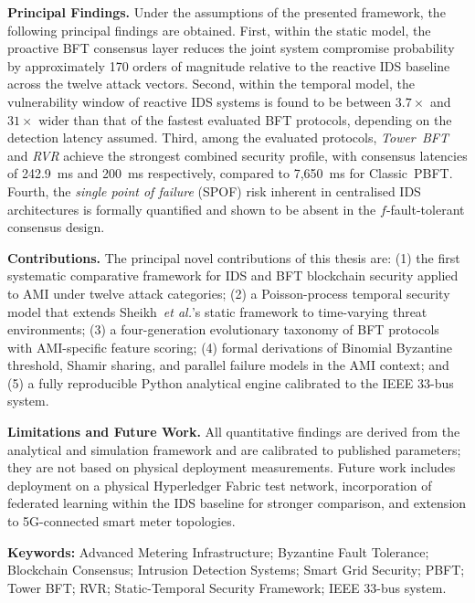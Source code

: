 \documentclass[12pt, oneside, a4paper]{report}
\theoremstyle{definition}
\theoremstyle{remark}
\begin{document}
\noindent\textbf{Principal Findings.}
Under the assumptions of the presented framework, the following principal findings are obtained. First, within the static model, the proactive BFT consensus layer reduces the joint system compromise probability by approximately 170 orders of magnitude relative to the reactive IDS baseline across the twelve attack vectors. Second, within the temporal model, the vulnerability window of reactive IDS systems is found to be between $3.7\times$ and $31\times$ wider than that of the fastest evaluated BFT protocols, depending on the detection latency assumed. Third, among the evaluated protocols, \emph{Tower~BFT} and \emph{RVR} achieve the strongest combined security profile, with consensus latencies of 242.9~ms and 200~ms respectively, compared to 7,650~ms for Classic~PBFT. Fourth, the \emph{single point of failure} (SPOF) risk inherent in centralised IDS architectures is formally quantified and shown to be absent in the $f$-fault-tolerant consensus design.

\medskip

\noindent\textbf{Contributions.}
The principal novel contributions of this thesis are: (1) the first systematic comparative framework for IDS and BFT blockchain security applied to AMI under twelve attack categories; (2) a Poisson-process temporal security model that extends Sheikh~\emph{et al.}'s static framework to time-varying threat environments; (3) a four-generation evolutionary taxonomy of BFT protocols with AMI-specific feature scoring; (4) formal derivations of Binomial Byzantine threshold, Shamir sharing, and parallel failure models in the AMI context; and (5) a fully reproducible Python analytical engine calibrated to the IEEE 33-bus system.

\medskip

\noindent\textbf{Limitations and Future Work.}
All quantitative findings are derived from the analytical and simulation framework and are calibrated to published parameters; they are not based on physical deployment measurements. Future work includes deployment on a physical Hyperledger Fabric test network, incorporation of federated learning within the IDS baseline for stronger comparison, and extension to 5G-connected smart meter topologies.

\bigskip

\noindent\textbf{Keywords:} Advanced Metering Infrastructure; Byzantine Fault Tolerance; Blockchain Consensus; Intrusion Detection Systems; Smart Grid Security; PBFT; Tower BFT; RVR; Static-Temporal Security Framework; IEEE 33-bus system.
\end{document}
